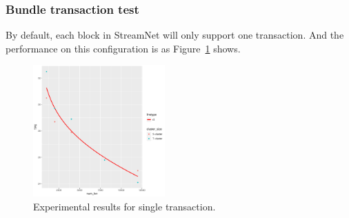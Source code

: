\subsubsection {Bundle transaction test}

By default, each block in StreamNet will only support one transaction. And the performance on this configuration is as Figure~\ref{single_txn} shows.

\begin{figure}[!ht]
\begin{center}
\includegraphics[width=0.45\textwidth]{figures/single_txn.pdf}
    \caption{
        Experimental results for single transaction.
     }
\label{single_txn}
\end{center}
\end{figure}


